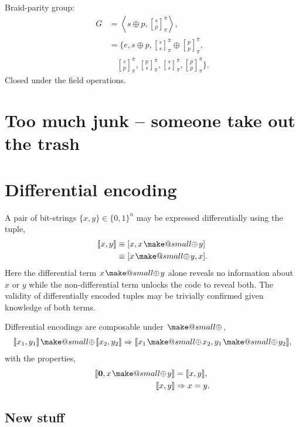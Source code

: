 \documentclass[twocolumn, aps, amsmath, amssymb, nofootinbib, superscriptaddress, longbibliography, doublefloatfix, table-of-contents, eqsecnum, rmp]{revtex4-2}
\makeatletter
\def\zerovec{\mathbf{0}}
\def\diff#1#2{\llbracket #1,#2\rrbracket}
\newcommand{\stackbraid}[2]{{\genfrac{[}{]}{0pt}{}{{#1}}{{#2}}}^{\bar{\pi}}_{\pi}}
\newcommand{\soplus}{{{\hspace{1pt}}{\mathbin{\mathpalette\make@small{\mathbin\oplus}}}}{\hspace{1pt}}}
\newcommand{\make@small}[2]{%
  \vcenter{\hbox{%
    \scalebox{0.6}{$\m@th#1#2$}%
  }}%
}
\makeatother
\begin{document}
Braid-parity group:
\begin{align}
	G &= \left\langle s\oplus p, \stackbraid{s}{p} \right\rangle,\nonumber\\
	&= \{e, s\oplus p, \stackbraid{s}{s} \oplus \stackbraid{p}{p},\nonumber\\
	&\quad \stackbraid{s}{p}, \stackbraid{p}{s}, \stackbraid{s}{s}, \stackbraid{p}{p} \}.
\end{align}
Closed under the field operations.

\newpage

\section{Too much junk -- someone take out the trash}

\section{Differential encoding}

A pair of bit-strings $\{x,y\}\in\{0,1\}^n$ may be expressed differentially using the tuple,
\begin{align}
	\diff{x}{y} &\equiv [x,x\soplus y] \nonumber\\
	&\equiv [x\soplus y,x].
\end{align}
Here the differential term $x\soplus y$ alone reveals no information about $x$ or $y$ while the non-differential term unlocks the code to reveal both. The validity of differentially encoded tuples may be trivially confirmed given knowledge of both terms.

Differential encodings are composable under $\soplus$,
\begin{align}
	\diff{x_1}{y_1} \soplus \diff{x_2}{y_2} \Rightarrow \diff{x_1\soplus x_2}{y_1 \soplus y_2},
\end{align}
with the properties,
\begin{align}
	\diff{\zerovec}{x\soplus y} &= \diff{x}{y}, \nonumber\\
	\diff{x}{y} &\Rightarrow x=y.
\end{align}

\subsection{New stuff}
\end{document}
